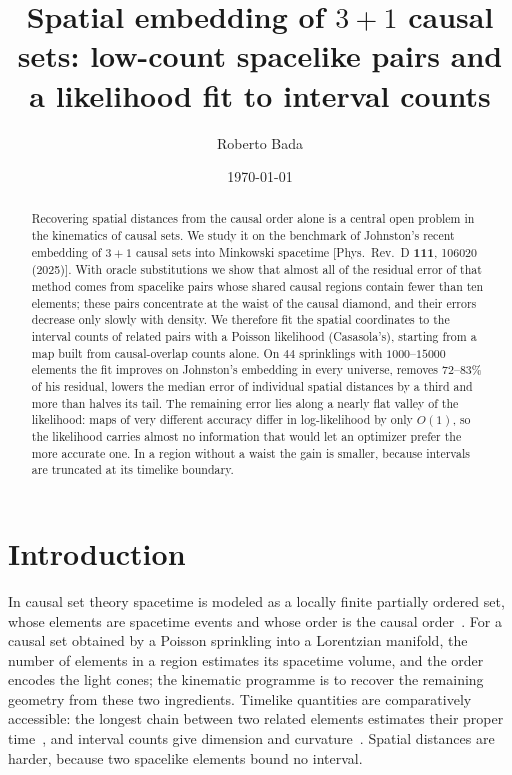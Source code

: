 \documentclass[prd,twocolumn,superscriptaddress,nofootinbib,amsmath,amssymb,floatfix]{revtex4-2}
\begin{document}
\title{Spatial embedding of $3+1$ causal sets: low-count spacelike pairs and a likelihood fit to interval counts}

\author{Roberto Bada}

\date{\today}

\begin{abstract}
Recovering spatial distances from the causal order alone is a central open problem in the kinematics of causal sets. We study it on the benchmark of Johnston's recent embedding of $3+1$ causal sets into Minkowski spacetime [Phys.\ Rev.\ D \textbf{111}, 106020 (2025)]. With oracle substitutions we show that almost all of the residual error of that method comes from spacelike pairs whose shared causal regions contain fewer than ten elements; these pairs concentrate at the waist of the causal diamond, and their errors decrease only slowly with density. We therefore fit the spatial coordinates to the interval counts of related pairs with a Poisson likelihood (Casasola's), starting from a map built from causal-overlap counts alone. On $44$ sprinklings with $1000$--$15000$ elements the fit improves on Johnston's embedding in every universe, removes $72$--$83\%$ of his residual, lowers the median error of individual spatial distances by a third and more than halves its tail. The remaining error lies along a nearly flat valley of the likelihood: maps of very different accuracy differ in log-likelihood by only $O(1)$, so the likelihood carries almost no information that would let an optimizer prefer the more accurate one. In a region without a waist the gain is smaller, because intervals are truncated at its timelike boundary.
\end{abstract}

\maketitle

\section{Introduction}\label{sec:intro}
In causal set theory spacetime is modeled as a locally finite partially ordered set, whose elements are spacetime events and whose order is the causal order~\cite{BLMS87,Surya19}. For a causal set obtained by a Poisson sprinkling into a Lorentzian manifold, the number of elements in a region estimates its spacetime volume, and the order encodes the light cones; the kinematic programme is to recover the remaining geometry from these two ingredients. Timelike quantities are comparatively accessible: the longest chain between two related elements estimates their proper time~\cite{BrightwellGregory91}, and interval counts give dimension and curvature~\cite{GlaserSurya13,RSS13,BD10}. Spatial distances are harder, because two spacelike elements bound no interval.
\end{document}

